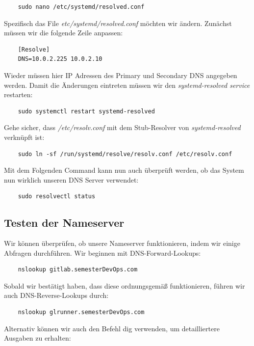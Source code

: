 \documentclass[a4paper,12pt]{article}
\begin{document}
\begin{verbatim}
	sudo nano /etc/systemd/resolved.conf
\end{verbatim}

Spezifisch das File \textit{etc/systemd/resolved.conf} möchten wir ändern.
Zunächst müssen wir die folgende Zeile anpassen:


\begin{verbatim}
	[Resolve]
	DNS=10.0.2.225 10.0.2.10
\end{verbatim}

Wieder müssen hier IP Adressen des Primary und Secondary DNS angegeben werden.
Damit die Änderungen eintreten müssen wir den \textit{systemd-resolved service} restarten:

\begin{verbatim}
	sudo systemctl restart systemd-resolved
\end{verbatim}

Gehe sicher, dass \textit{/etc/resolv.conf} mit dem Stub-Resolver von \textit{systemd-resolved} verknüpft ist:

\begin{verbatim}
	sudo ln -sf /run/systemd/resolve/resolv.conf /etc/resolv.conf
\end{verbatim}

Mit dem Folgenden Command kann nun auch überprüft werden, ob das System nun wirklich unseren DNS Server verwendet:

\begin{verbatim}
	sudo resolvectl status
\end{verbatim}

\subsection{Testen der Nameserver}
Wir können überprüfen, ob unsere Nameserver funktionieren, indem wir einige Abfragen durchführen. Wir beginnen mit DNS-Forward-Lookups:

\begin{verbatim}
	nslookup gitlab.semesterDevOps.com
\end{verbatim}

Sobald wir bestätigt haben, dass diese ordnungsgemäß funktionieren, führen wir auch DNS-Reverse-Lookups durch:


\begin{verbatim}
	nslookup glrunner.semesterDevOps.com
\end{verbatim}


Alternativ können wir auch den Befehl dig verwenden, um detailliertere Ausgaben zu erhalten:
\end{document}
